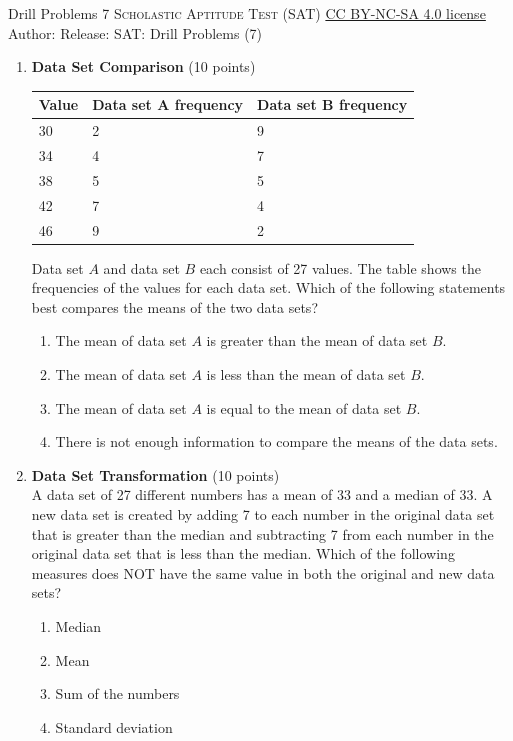 \newpage\handout
{Drill Problems 7}
{\textsc{Scholastic Aptitude Test (SAT)}}
{\href{https://creativecommons.org/licenses/by-nc-sa/4.0/}{CC BY-NC-SA 4.0 license}}
{Author: \BookAuthor}{Release: \generatedOn}
{SAT: Drill Problems (7)}



\begin{enumerate}
  \item \textbf{Data Set Comparison} (10 points)\\
  \begin{center}
  \begin{tabular}{|l|l|l|}
  \hline
  \textbf{Value} & \textbf{Data set A frequency} & \textbf{Data set B frequency} \\
  \hline
  30 & 2 & 9 \\
  \hline
  34 & 4 & 7 \\
  \hline
  38 & 5 & 5 \\
  \hline
  42 & 7 & 4 \\
  \hline
  46 & 9 & 2 \\
  \hline
  \end{tabular}
  \end{center}

  Data set $A$ and data set $B$ each consist of 27 values. The table shows the frequencies of the values for each data set. Which of the following statements best compares the means of the two data sets?
  \begin{enumerate}[label=(\Alph*)]
    \item The mean of data set $A$ is greater than the mean of data set $B$.
    \item The mean of data set $A$ is less than the mean of data set $B$.
    \item The mean of data set $A$ is equal to the mean of data set $B$.
    \item There is not enough information to compare the means of the data sets.
  \end{enumerate}
  \begin{subanswer}
  \end{subanswer}

  \item \textbf{Data Set Transformation} (10 points)\\
  A data set of 27 different numbers has a mean of 33 and a median of 33. A new data set is created by adding 7 to each number in the original data set that is greater than the median and subtracting 7 from each number in the original data set that is less than the median. Which of the following measures does NOT have the same value in both the original and new data sets?
  \begin{enumerate}[label=(\Alph*)]
    \item Median
    \item Mean
    \item Sum of the numbers
    \item Standard deviation
  \end{enumerate}
  \begin{subanswer}
  \end{subanswer}


\end{enumerate}
